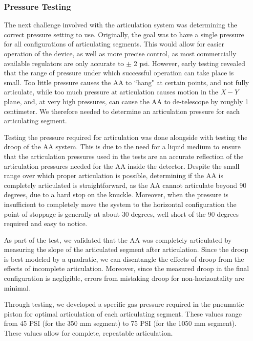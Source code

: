 \subsubsection{Pressure Testing}
\label{sec:Pressure Tests}
  The next challenge involved with the articulation system was determining the correct pressure setting to use. Originally, the goal was to have a single pressure for all configurations of articulating segments. This would allow for easier operation of the device, as well as more precise control, as most commercially available regulators are only accurate to $\pm$ 2 psi. However, early testing revealed that the range of pressure under which successful operation can take place is  small. Too little pressure causes the AA to ``hang" at certain points, and not fully articulate, while too much pressure at articulation causes motion in the $X-Y$ plane, and, at very high pressures, can cause the AA to de-telescope by roughly 1 centimeter.  We therefore needed to determine an articulation pressure for each articulating segment.
  
Testing the pressure required for articulation was done alongside with testing the droop of the AA system. This is due to the need for a liquid medium to ensure that the articulation pressures used in the tests are an accurate reflection of the articulation pressures needed for the AA inside the detector. Despite the small range over which proper articulation is possible, determining if the AA is completely articulated is straightforward, as the AA cannot articulate beyond 90 degrees, due to a hard stop on the knuckle. Moreover, when the pressure is insufficient to completely move the system to the horizontal configuration the point of stoppage is generally at about 30 degrees, well short of the 90 degrees required and easy to notice.

As part of the test, we validated that the AA was completely articulated by measuring the slope of the articulated segment after articulation. Since the droop is best modeled by a quadratic, we can disentangle the effects of droop from the effects of incomplete articulation. Moreover, since the measured droop in the final configuration is negligible, errors from mistaking droop for non-horizontality are minimal. 

Through testing, we developed a specific gas pressure required in the pneumatic piston for optimal articulation of each articulating segment. These values range from 45 PSI  (for the 350 mm segment) to 75 PSI (for the 1050 mm segment). These values allow for complete, repeatable articulation. 


